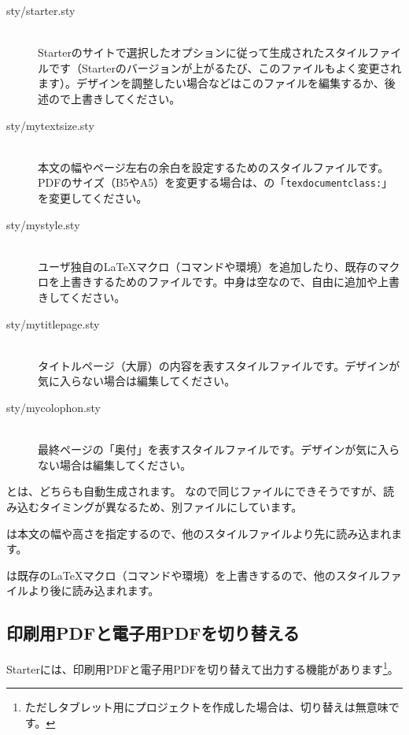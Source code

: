 \begin{description}
\item[sty/starter.sty] \mbox{} \\
Starterのサイトで選択したオプションに従って生成されたスタイルファイルです（Starterのバージョンが上がるたび、このファイルもよく変更されます）。デザインを調整したい場合などはこのファイルを編集するか、後述ので上書きしてください。
\item[sty/mytextsize.sty] \mbox{} \\
本文の幅やページ左右の余白を設定するためのスタイルファイルです。PDFのサイズ（B5やA5）を変更する場合は、の「\texttt{texdocumentclass:}」を変更してください。
\item[sty/mystyle.sty] \mbox{} \\
ユーザ独自の\LaTeX{}マクロ（コマンドや環境）を追加したり、既存のマクロを上書きするためのファイルです。中身は空なので、自由に追加や上書きしてください。
\item[sty/mytitlepage.sty] \mbox{} \\
タイトルページ（大扉）の内容を表すスタイルファイルです。デザインが気に入らない場合は編集してください。
\item[sty/mycolophon.sty] \mbox{} \\
最終ページの「奥付」を表すスタイルファイルです。デザインが気に入らない場合は編集してください。
\end{description}

とは、どちらも自動生成されます。
なので同じファイルにできそうですが、読み込むタイミングが異なるため、別ファイルにしています。

\begin{starteritemize}
\item {}は本文の幅や高さを指定するので、他のスタイルファイルより先に読み込まれます。
\item {}は既存の\LaTeX{}マクロ（コマンドや環境）を上書きするので、他のスタイルファイルより後に読み込まれます。
\end{starteritemize}

\subsection*{印刷用PDFと電子用PDFを切り替える}
\label{sec:1-3-2}
\label{bn2iw}

Starterには、印刷用PDFと電子用PDFを切り替えて出力する機能があります\footnote{ただしタブレット用にプロジェクトを作成した場合は、切り替えは無意味です。}。

